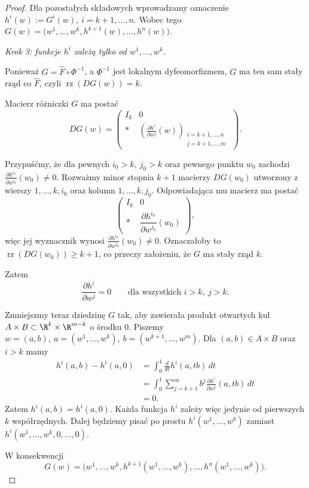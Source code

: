\begin{proof}
Dla pozostałych składowych wprowadzamy oznaczenie $h^i(w):=G^i(w), \ i=k+1,\dots,n$.
Wobec tego $G(w) = \bigl( w^1,\dots,w^k, h^{k+1}(w),\dots,h^n(w) \bigr)$.

\medskip
\emph{Krok 3: funkcje $h^i$ zależą tylko od
$w^1,\dots,w^k$.}

Ponieważ $G=\widehat F\circ\Phi^{-1}$,
a $\Phi^{-1}$ jest lokalnym dyfeomorfizmem, $G$ ma ten sam
stały rząd co $\widehat F$, czyli $\operatorname{rz}(DG(w))=k$.

Macierz różniczki $G$ ma postać
\[
DG(w)
=
\begin{pmatrix}
I_k&0\\
*&
\left(
\frac{\partial h^i}{\partial w^j}(w)
\right)_{\substack{i=k+1,\dots,n\\ j=k+1,\dots,m}}
\end{pmatrix}.
\]

Przypuśćmy, że dla pewnych $i_0>k, \ j_0>k$
oraz pewnego punktu $w_0$ zachodzi $\frac{\partial h^{i_0}}{\partial w^{j_0}}(w_0)\neq0$.
Rozważmy minor stopnia $k+1$ macierzy $DG(w_0)$ utworzony
z wierszy $1,\dots,k,i_0$
oraz kolumn $1,\dots,k,j_0$.
Odpowiadająca mu macierz ma postać
\[
\begin{pmatrix}
I_k&0\\
*&
\dfrac{\partial h^{i_0}}{\partial w^{j_0}}(w_0)
\end{pmatrix},
\]
więc jej wyznacznik wynosi $\frac{\partial h^{i_0}}{\partial w^{j_0}}(w_0)\neq0$.
Oznaczałoby to $\operatorname{rz}(DG(w_0))\geq k+1$,
co przeczy założeniu, że $G$ ma stały rząd $k$.

Zatem
\[
\frac{\partial h^i}{\partial w^j}=0
\qquad
\text{dla wszystkich }i>k,\ j>k.
\]

Zmniejszmy teraz dziedzinę $G$ tak, aby zawierała produkt
otwartych kul $A\times B \subset \R^k\times\R^{m-k}$
o środku $0$. Piszemy $w=(a,b), \ a=(w^1,\dots,w^k), \ b=(w^{k+1},\dots,w^m)$.
Dla $(a,b)\in A\times B$ oraz $i>k$ mamy
\begin{align*}
h^i(a,b)-h^i(a,0)
&=
\int_0^1
\frac{d}{dt}h^i(a,tb)\,dt\\
&=
\int_0^1
\sum_{j=k+1}^m
b^j
\frac{\partial h^i}{\partial w^j}(a,tb)\,dt\\
&=
0.
\end{align*}
Zatem $h^i(a,b)=h^i(a,0)$.
Każda funkcja $h^i$ zależy więc jedynie od pierwszych $k$
współrzędnych. Dalej będziemy pisać po prostu $h^i(w^1,\dots,w^k)$
zamiast $h^i(w^1,\dots,w^k,0,\dots,0)$.

W konsekwencji
\[
G(w) = \bigl( w^1,\dots,w^k, h^{k+1}(w^1,\dots,w^k), \dots, h^n(w^1,\dots,w^k) \bigr).
\]


\end{proof}
